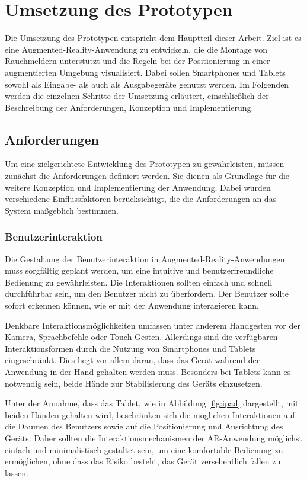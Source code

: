 \chapter{Umsetzung des Prototypen}

Die Umsetzung des Prototypen entspricht dem Hauptteil dieser Arbeit. Ziel ist es eine Augmented-Reality-Anwendung zu entwickeln, die die Montage von Rauchmeldern unterstützt und die Regeln bei der Positionierung in einer augmentierten Umgebung visualisiert. Dabei sollen Smartphones und Tablets sowohl als Eingabe- als auch als Ausgabegeräte genutzt werden. Im Folgenden werden die einzelnen Schritte der Umsetzung erläutert, einschließlich der Beschreibung der Anforderungen, Konzeption und Implementierung.

\section{Anforderungen}\label{sec:requirements}

Um eine zielgerichtete Entwicklung des Prototypen zu gewährleisten, müssen zunächst die Anforderungen definiert werden. Sie dienen als Grundlage für die weitere Konzeption und Implementierung der Anwendung. Dabei wurden verschiedene Einflussfaktoren berücksichtigt, die die Anforderungen an das System maßgeblich bestimmen.

\subsection{Benutzerinteraktion}

Die Gestaltung der Benutzerinteraktion in Augmented-Reality-Anwendungen muss sorgfältig geplant werden, um eine intuitive und benutzerfreundliche Bedienung zu gewährleisten. Die Interaktionen sollten einfach und schnell durchführbar sein, um den Benutzer nicht zu überfordern. Der Benutzer sollte sofort erkennen können, wie er mit der Anwendung interagieren kann. 

Denkbare Interaktionsmöglichkeiten umfassen unter anderem Handgesten vor der Kamera, Sprachbefehle oder Touch-Gesten. Allerdings sind die verfügbaren Interaktionsformen durch die Nutzung von Smartphones und Tablets eingeschränkt. Dies liegt vor allem daran, dass das Gerät während der Anwendung in der Hand gehalten werden muss. Besonders bei Tablets kann es notwendig sein, beide Hände zur Stabilisierung des Geräts einzusetzen.

Unter der Annahme, dass das Tablet, wie in Abbildung \ref{fig:ipad} dargestellt, mit beiden Händen gehalten wird, beschränken sich die möglichen Interaktionen auf die Daumen des Benutzers sowie auf die Positionierung und Ausrichtung des Geräts. Daher sollten die Interaktionsmechanismen der AR-Anwendung möglichst einfach und minimalistisch gestaltet sein, um eine komfortable Bedienung zu ermöglichen, ohne dass das Risiko besteht, das Gerät versehentlich fallen zu lassen.

